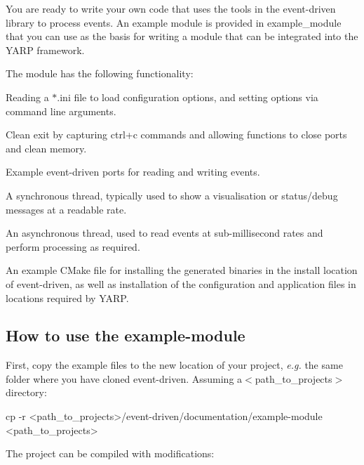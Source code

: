 You are ready to write your own code that uses the tools in the {\ttfamily event-\/driven} library to process events. An example module is provided in example\+\_\+module that you can use as the basis for writing a module that can be integrated into the {\ttfamily Y\+A\+RP} framework.

The module has the following functionality\+:


\begin{DoxyItemize}
\item Reading a {\ttfamily $\ast$.ini} file to load configuration options, and setting options via command line arguments.
\item Clean exit by capturing {\ttfamily ctrl+c} commands and allowing functions to close ports and clean memory.
\item Example {\ttfamily event-\/driven} ports for reading and writing events.
\item A synchronous thread, typically used to show a visualisation or status/debug messages at a readable rate.
\item An asynchronous thread, used to read events at sub-\/millisecond rates and perform processing as required.
\item An example C\+Make file for installing the generated binaries in the install location of {\ttfamily event-\/driven}, as well as installation of the configuration and application files in locations required by {\ttfamily Y\+A\+RP}.
\end{DoxyItemize}

\subsection*{How to use the example-\/module}

First, copy the example files to the new location of your project, {\itshape e.\+g.} the same folder where you have cloned {\ttfamily event-\/driven}. Assuming a{\ttfamily $<$path\+\_\+to\+\_\+projects$>$} directory\+: 
\begin{DoxyCode}
cp -r <path\_to\_projects>/event-driven/documentation/example-module <path\_to\_projects>
\end{DoxyCode}


The project can be compiled with modifications\+: 


